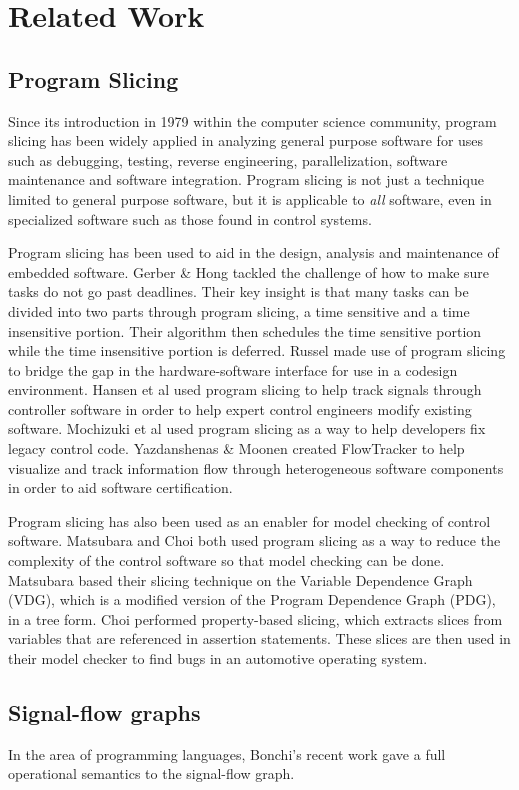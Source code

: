 \section{Related Work} \label{related}


\subsection{Program Slicing}

Since its introduction in 1979 within the computer science community,
program slicing has been widely applied in analyzing general purpose
software for uses such as debugging, testing, reverse engineering,
parallelization, software maintenance and software integration. Program slicing is not just a technique limited to general purpose software, but it is
applicable to \textit{all} software, even in specialized software such
as those found in control systems.

Program slicing has been used to aid in the design, analysis and
maintenance of embedded software. Gerber \& Hong
\cite{gerber_slicing_1997} tackled the challenge of how to make sure tasks do not go past
deadlines. Their key insight is that many tasks can be divided into
two parts through program slicing, a time sensitive and a time insensitive portion. Their
algorithm then schedules the time sensitive portion while the time
insensitive portion is deferred. Russel
\cite{russell_program_2002} made use of program slicing to bridge the
gap in the hardware-software interface for use in a codesign
environment. Hansen et al \cite{hansen_assisted_2008}
\cite{hansen_maintenance_2010} used program slicing to help track
signals through controller software in order to help expert control
engineers modify existing software. Mochizuki et al
\cite{mochizuki_study_2014} used program slicing as a way to help
developers fix legacy control code. Yazdanshenas \&
Moonen \cite{yazdanshenas_crossing_2011} \cite{moonen_analyzing_2016} 
created FlowTracker to help visualize and track information flow
through heterogeneous software components in order to aid software
certification.

Program slicing has also been used as an enabler for
model checking of control software. Matsubara 
\cite{matsubara_model_2013} and Choi \cite{choi_efficient_2015} both
used program slicing as a way to reduce the complexity of the control software
so that model checking can be done. Matsubara based their slicing
technique on the Variable Dependence Graph (VDG), which is a modified
version of the Program Dependence Graph (PDG), in a tree form. Choi
performed property-based slicing, which extracts slices from variables
that are referenced in assertion statements. These slices are then
used in their model checker to find bugs in an automotive operating system. 


\subsection{Signal-flow graphs}
In the area of programming languages, Bonchi's recent work
\cite{bonchi_full_2015} gave a full operational semantics to the
signal-flow graph.
